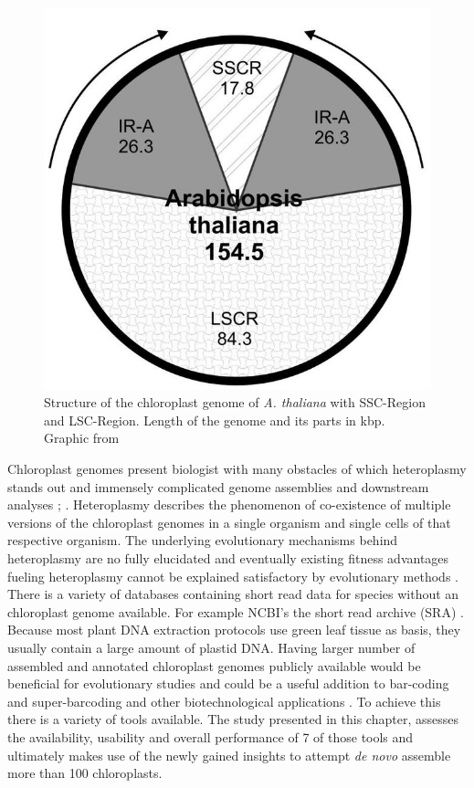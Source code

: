 \begin{figure}[H]
\centering
\includegraphics[height=.55\textheight, width=.95\textwidth]{Figures/cpast}
\decoRule
\caption[Structure of a chloroplast genome]{Structure of the chloroplast genome of \textit{A. thaliana} with SSC-Region and LSC-Region. Length of the genome and its parts in kbp. Graphic from \cite{olejniczak2016chloroplasts}}
\label{fig:cpast_genome}
\end{figure}

Chloroplast genomes present biologist with many obstacles of which
heteroplasmy stands out and immensely complicated genome assemblies
and downstream analyses \cite{corriveau_1988}; \cite{Chat2002}.
Heteroplasmy describes the phenomenon of co-existence of multiple
versions of the chloroplast genomes in a single organism and single
cells of that respective organism. The underlying evolutionary
mechanisms behind heteroplasmy are no fully elucidated and eventually
existing fitness advantages fueling heteroplasmy cannot be explained
satisfactory by evolutionary methods \cite{Scar2016}.  There is a
variety of databases containing short read data for species without an
chloroplast genome available. For example NCBI's the short read
archive (SRA) \cite{SRA2010}. Because most plant DNA extraction
protocols use green leaf tissue as basis, they usually contain a large
amount of plastid DNA. Having larger number of assembled and annotated
chloroplast genomes publicly available would be beneficial for
evolutionary studies and could be a useful addition to bar-coding and
super-barcoding \cite{coissac_barcodes_2016} and other
biotechnological applications \cite{daniell_chloroplast_2016}. To
achieve this there is a variety of tools available. The study
presented in this chapter, assesses the availability, usability and
overall performance of 7 of those tools and ultimately makes use of
the newly gained insights to attempt \textit{de novo} assemble more
than 100 chloroplasts.




